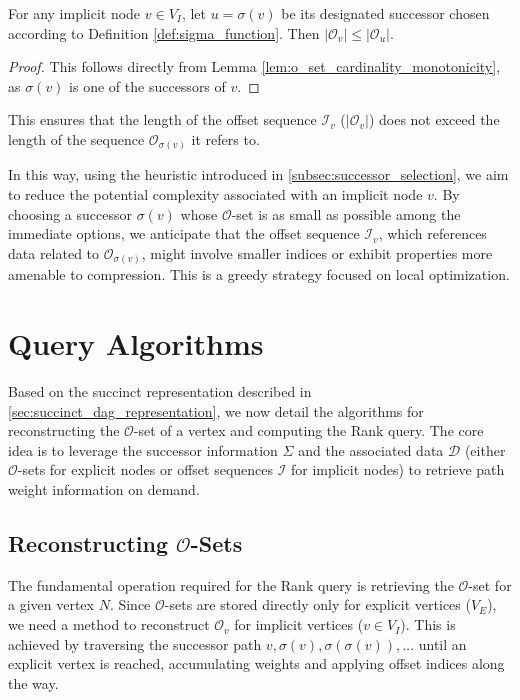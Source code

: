 \begin{proposition}
    For any implicit node $v \in V_I$, let $u = \sigma(v)$ be its designated successor chosen according to Definition \ref{def:sigma_function}. Then $|\mathcal{O}_v| \le |\mathcal{O}_u|$.
\end{proposition}
\begin{proof}
    This follows directly from Lemma \ref{lem:o_set_cardinality_monotonicity}, as $\sigma(v)$ is one of the successors of $v$.
\end{proof}
This ensures that the length of the offset sequence $\mathcal{I}_v$ ($|\mathcal{O}_v|$) does not exceed the length of the sequence $\mathcal{O}_{\sigma(v)}$ it refers to.

In this way, using the heuristic introduced in \ref{subsec:successor_selection}, we aim to reduce the potential complexity associated with an implicit node $v$. By choosing a successor $\sigma(v)$ whose $\mathcal{O}$-set is as small as possible among the immediate options, we anticipate that the offset sequence $\mathcal{I}_v$, which references data related to $\mathcal{O}_{\sigma(v)}$, might involve smaller indices or exhibit properties more amenable to compression. This is a greedy strategy focused on local optimization.


\section{Query Algorithms}
\label{sec:query_algorithms}

Based on the succinct representation described in \autoref{sec:succinct_dag_representation}, we now detail the algorithms for reconstructing the $\mathcal{O}$-set of a vertex and computing the Rank query. The core idea is to leverage the successor information $\Sigma$ and the associated data $\mathcal{D}$ (either $\mathcal{O}$-sets for explicit nodes or offset sequences $\mathcal{I}$ for implicit nodes) to retrieve path weight information on demand.

\subsection{Reconstructing $\mathcal{O}$-Sets}
\label{subsec:reconstructing_o_sets}

The fundamental operation required for the Rank query is retrieving the $\mathcal{O}$-set for a given vertex $N$. Since $\mathcal{O}$-sets are stored directly only for explicit vertices ($V_E$), we need a method to reconstruct $\mathcal{O}_v$ for implicit vertices ($v \in V_I$). This is achieved by traversing the successor path $v, \sigma(v), \sigma(\sigma(v)), \dots$ until an explicit vertex is reached, accumulating weights and applying offset indices along the way.

